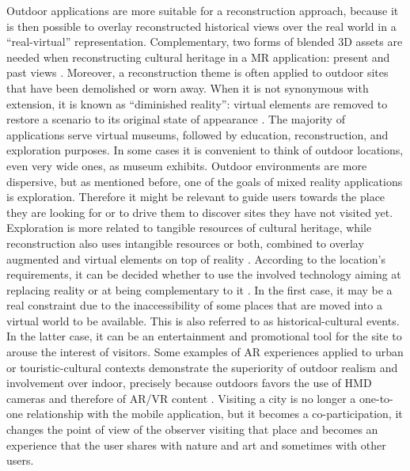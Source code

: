 Outdoor applications are more suitable for a reconstruction approach, because it is then possible to overlay reconstructed historical views over the real world in a “real-virtual” representation. Complementary, two forms of blended 3D assets are needed when reconstructing cultural heritage in a MR application: present and past views \cite{bekele_survey_2018}. Moreover, a reconstruction theme is often applied to outdoor sites that have been demolished or worn away. When it is not synonymous with extension, it is known as “diminished reality”: virtual elements are removed to restore a scenario to its original state of appearance \cite{honkanen_enhancing_2018}. 
The majority of applications serve virtual museums, followed by education, reconstruction, and exploration purposes.
In some cases it is convenient to think of outdoor locations, even very wide ones, as museum exhibits. Outdoor environments are more dispersive, but as mentioned before, one of the goals of mixed reality applications is exploration. Therefore it might be relevant to guide users towards the place they are looking for \cite{jenny_enhancing_2017} or to drive them to discover sites they have not visited yet. Exploration is more related to tangible resources of cultural heritage, while reconstruction also uses intangible resources or both, combined to overlay augmented and virtual elements on top of reality \cite{bekele_survey_2018}. According to the location's requirements, it can be decided whether to use the involved technology aiming at replacing reality or at being complementary to it \cite{racz_virtual_2019}. In the first case, it may be a real constraint due to the inaccessibility of some places that are moved into a virtual world to be available. This is also referred to as historical-cultural events. In the latter case, it can be an entertainment and promotional tool for the site to arouse the interest of visitors.
Some examples of AR experiences applied to urban or touristic-cultural contexts demonstrate the superiority of outdoor realism and involvement over indoor, precisely because outdoors favors the use of \gls{HMD} cameras and therefore of AR/VR content \cite{iacoviello_holocities_2020}. Visiting a city is no longer a one-to-one relationship with the mobile application, but it becomes a co-participation, it changes the point of view of the observer visiting that place and becomes an experience that the user shares with nature and art and sometimes with other users.
